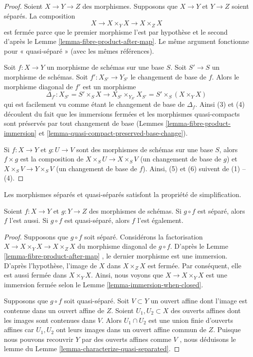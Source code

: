 \begin{proof}
Soient  $X \to Y \to Z$  des morphismes. Supposons que  $X \to Y$  et  $Y \to Z$ 
soient séparés. La composition
$$
X \to X \times_Y X \to X \times_Z X
$$
est fermée parce que le premier morphisme l'est par hypothèse et le second d'après le Lemme
 \ref{lemma-fibre-product-after-map}. Le même argument fonctionne pour « quasi-séparé » (avec les mêmes
références).

\medskip\noindent
Soit  $f : X \to Y$  un morphisme de schémas sur une base  $S$. Soit
 $S' \to S$  un morphisme de schémas. Soit  $f' : X_{S'} \to Y_{S'}$  le changement de base de
 $f$. Alors le morphisme diagonal de  $f'$  est un morphisme
$$
\Delta_{f'} :
X_{S'} = S' \times_S X
\longrightarrow
X_{S'} \times_{Y_{S'}} X_{S'} = S' \times _S (X \times_Y X)
$$
qui est facilement vu comme étant le changement de base de  $\Delta_f$. Ainsi (3)
et (4) découlent du fait que les immersions fermées et les morphismes
quasi-compacts sont préservés par tout changement de base (Lemmes  \ref{lemma-fibre-product-immersion}  et
 \ref{lemma-quasi-compact-preserved-base-change}).

\medskip\noindent
Si  $f : X \to Y$  et  $g : U \to V$  sont des morphismes de schémas sur une base
 $S$, alors  $f \times g$  est la composition de  $X \times_S U \to X \times_S V$  (un changement
de base de  $g$) et  $X \times_S V \to Y \times_S V$  (un changement de base de  $f$).
Ainsi, (5) et (6) suivent de (1)  --  (4).
\end{proof}

\begin{lemma}
\label{lemma-compose-after-separated}
\begin{slogan}
Les morphismes séparés et quasi-séparés satisfont la propriété de simplification.
\end{slogan}
Soient  $f : X \to Y$  et  $g : Y \to Z$  des morphismes de schémas. Si  $g \circ f$  est
séparé, alors  $f$ l'est aussi. Si  $g \circ f$  est quasi-séparé, alors
 $f$ l'est également.
\end{lemma}

\begin{proof}
Supposons que  $g \circ f$  soit séparé. Considérons la factorisation  $X \to X \times_Y X \to X \times_Z X$ 
du morphisme diagonal de  $g \circ f$. D'après le Lemme  \ref{lemma-fibre-product-after-map} , le dernier
morphisme est une immersion. D'après l'hypothèse, l'image de  $X$  dans
 $X \times_Z X$  est fermée. Par conséquent, elle est aussi fermée dans  $X \times_Y X$.
Ainsi, nous voyons que  $X \to X \times_Y X$  est une immersion fermée selon le Lemme
 \ref{lemma-immersion-when-closed}.

\medskip\noindent
Supposons que  $g \circ f$  soit quasi-séparé. Soit  $V \subset Y$  un ouvert affine
dont l'image est contenue dans un ouvert affine de  $Z$. Soient  $U_1, U_2 \subset X$  des
ouverts affines dont les images sont contenues dans  $V$. Alors  $U_1 \cap U_2$  est une
union finie d'ouverts affines car  $U_1, U_2$  ont leurs images dans un ouvert affine
commun de  $Z$. Puisque nous pouvons recouvrir  $Y$  par des
ouverts affines comme  $V$ , nous déduisons le lemme du Lemme  \ref{lemma-characterize-quasi-separated}.
\end{proof}

